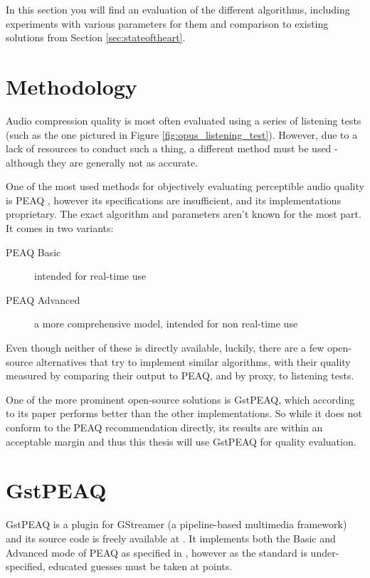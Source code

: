 In this section you will find an evaluation of the different algorithms, including experiments with various parameters for them and comparison to existing solutions from Section \ref{sec:stateoftheart}.

\section{Methodology}
Audio compression quality is most often evaluated using a series of listening tests (such as the one pictured in Figure \ref{fig:opus_listening_test}). However, due to a lack of resources to conduct such a thing, a different method must be used - although they are generally not as accurate.

One of the most used methods for objectively evaluating perceptible audio quality is PEAQ \cite{peaq_2006}, however its specifications are insufficient, and its implementations proprietary. The exact algorithm and parameters aren't known for the most part. It comes in two variants:

\begin{description}
	\item[PEAQ Basic] intended for real-time use
	\item[PEAQ Advanced] a more comprehensive model, intended for non real-time use
\end{description}

Even though neither of these is directly available, luckily, there are a few open-source alternatives that try to implement similar algorithms, with their quality measured by comparing their output to PEAQ, and by proxy, to listening tests.

One of the more prominent open-source solutions is GstPEAQ, which according to its paper \cite{gstpeaq_paper} performs better than the other implementations. So while it does not conform to the PEAQ recommendation directly, its results are within an acceptable margin and thus this thesis will use GstPEAQ for quality evaluation.

\section{GstPEAQ}
GstPEAQ is a plugin for GStreamer \cite{gstreamer_2016} (a pipeline-based multimedia framework) and its source code is freely available at \cite{gstpeaq_impl}. It implements both the Basic and Advanced mode of PEAQ as specified in \cite{peaq_2006}, however as the standard is under-specified, educated guesses must be taken at points.

